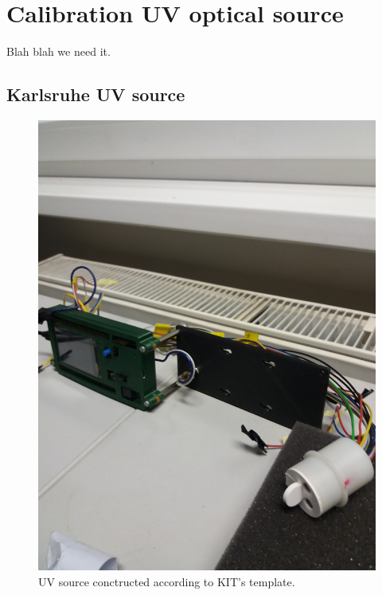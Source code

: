 
\chapter{Calibration UV optical source}
Blah blah we need it.
\section{Karlsruhe UV source}


 \begin{figure}[H]
 \centering
 \includegraphics[scale=0.09, angle = 270, origin = c]{./pictures/KarlsRuhe}
 \caption{UV source conctructed according to KIT's template.}
 \label{UVsource}
\end{figure}


